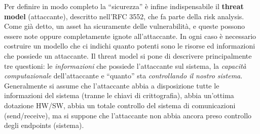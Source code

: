 Per definire in modo completo la “sicurezza” è infine indispensabile il \textbf{threat model} (attaccante), descritto nell'RFC 3552, che fa parte della risk analysis. Come già detto, un asset ha sicuramente delle vulnerabilità, e queste possono essere note oppure completamente ignote all'attaccante. In ogni caso è necessario costruire un modello che ci indichi quanto potenti sono le risorse ed informazioni che possiede un attaccante. Il threat model si pone di descrivere principalmente tre questioni: le \textit{informazioni} che possiede l'attaccante sul sistema, la \textit{capacità computazionale} dell'attaccante e “quanto” sta \textit{controllando il nostro sistema}. Generalmente si assume che l'attaccante abbia a disposizione tutte le informazioni del sistema (tranne le chiavi di crittografia), abbia un'ottima dotazione HW/SW, abbia un totale controllo del sistema di comunicazioni (send/receive), ma si suppone che l'attaccante non abbia ancora preso controllo degli endpoints (sistema).

